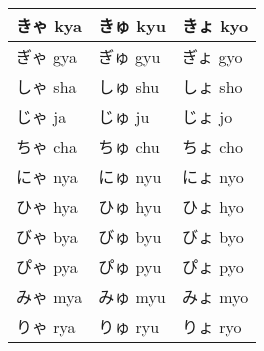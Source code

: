 \documentclass{article}
\begin{document}
{\begin{minipage}{\textwidth}
\begin{minipage}[t]{.49\textwidth}
      \Large{
        \begin{tabular}[t]{|l|l|l|}
        \hline
        きゃ   kya & きゅ   kyu & きょ   kyo \\ \hline
        ぎゃ   gya & ぎゅ   gyu & ぎょ   gyo \\ \hline
        しゃ   sha & しゅ   shu & しょ   sho \\ \hline
        じゃ   ja  & じゅ   ju  & じょ   jo  \\ \hline
        ちゃ   cha & ちゅ   chu & ちょ   cho \\ \hline
        にゃ   nya & にゅ   nyu & にょ   nyo \\ \hline
        ひゃ   hya & ひゅ   hyu & ひょ   hyo \\ \hline
        びゃ   bya & びゅ   byu & びょ   byo \\ \hline
        ぴゃ   pya & ぴゅ   pyu & ぴょ   pyo \\ \hline
        みゃ   mya & みゅ   myu & みょ   myo \\ \hline
        りゃ   rya & りゅ   ryu & りょ   ryo \\ \hline
        \end{tabular}
      }
    \end{minipage}
  \end{minipage}
}

\pagebreak

\end{document}
